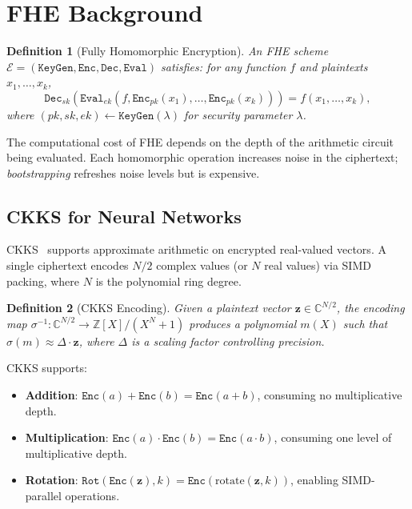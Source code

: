 \documentclass[11pt]{article}
\newtheorem{definition}{Definition}
\begin{document}
\section{FHE Background}
\label{sec:background}

\begin{definition}[Fully Homomorphic Encryption]
An FHE scheme $\mathcal{E} = (\texttt{KeyGen}, \texttt{Enc}, \texttt{Dec},
\texttt{Eval})$ satisfies: for any function $f$ and plaintexts $x_1, \ldots, x_k$,
\begin{equation}
\texttt{Dec}_{sk}\!\left(\texttt{Eval}_{ek}(f, \texttt{Enc}_{pk}(x_1), \ldots,
\texttt{Enc}_{pk}(x_k))\right) = f(x_1, \ldots, x_k),
\end{equation}
where $(pk, sk, ek) \leftarrow \texttt{KeyGen}(\lambda)$ for security
parameter $\lambda$.
\end{definition}

The computational cost of FHE depends on the depth of the arithmetic circuit
being evaluated. Each homomorphic operation increases noise in the ciphertext;
\emph{bootstrapping} refreshes noise levels but is expensive.

\subsection{CKKS for Neural Networks}

CKKS~\cite{ckks2017} supports approximate arithmetic on encrypted real-valued
vectors. A single ciphertext encodes $N/2$ complex values (or $N$ real values)
via SIMD packing, where $N$ is the polynomial ring degree.

\begin{definition}[CKKS Encoding]
Given a plaintext vector $\mathbf{z} \in \mathbb{C}^{N/2}$, the encoding map
$\sigma^{-1}: \mathbb{C}^{N/2} \to \mathbb{Z}[X]/(X^N+1)$ produces a
polynomial $m(X)$ such that $\sigma(m) \approx \Delta \cdot \mathbf{z}$, where
$\Delta$ is a scaling factor controlling precision.
\end{definition}

CKKS supports:
\begin{itemize}[leftmargin=1.1em]
    \item \textbf{Addition}: $\texttt{Enc}(a) + \texttt{Enc}(b) =
    \texttt{Enc}(a + b)$, consuming no multiplicative depth.
    \item \textbf{Multiplication}: $\texttt{Enc}(a) \cdot \texttt{Enc}(b) =
    \texttt{Enc}(a \cdot b)$, consuming one level of multiplicative depth.
    \item \textbf{Rotation}: $\texttt{Rot}(\texttt{Enc}(\mathbf{z}), k) =
    \texttt{Enc}(\text{rotate}(\mathbf{z}, k))$, enabling SIMD-parallel
    operations.
\end{itemize}
\end{document}
